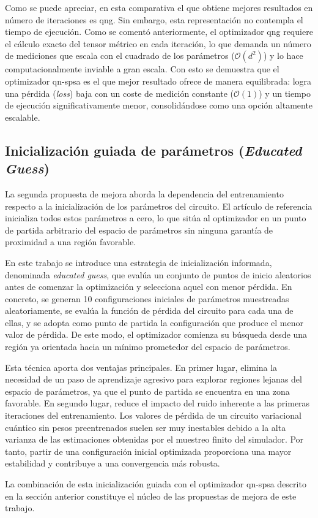 Como se puede apreciar, en esta comparativa el que obtiene mejores resultados en número de iteraciones es \gls{qng}. Sin embargo, esta representación no contempla el tiempo de ejecución. Como se comentó anteriormente, el optimizador \gls{qng} requiere el cálculo exacto del tensor métrico en cada iteración, lo que demanda un número de mediciones que escala con el cuadrado de los parámetros ($\mathcal{O}(d^2)$) y lo hace computacionalmente inviable a gran escala. Con esto se demuestra que el optimizador \gls{qn-spsa} es el que mejor resultado ofrece de manera equilibrada: logra una pérdida (\textit{loss}) baja con un coste de medición constante ($\mathcal{O}(1)$) y un tiempo de ejecución significativamente menor, consolidándose como una opción altamente escalable.

\subsection{Inicialización guiada de parámetros (\textit{Educated Guess})}
\label{subsec:educated_guess}

La segunda propuesta de mejora aborda la dependencia del entrenamiento respecto a la inicialización de los parámetros del circuito. El artículo de referencia \cite{ohno_qword2vec_2025} inicializa todos estos parámetros a cero, lo que sitúa al optimizador en un punto de partida arbitrario del espacio de parámetros sin ninguna garantía de proximidad a una región favorable.

En este trabajo se introduce una estrategia de inicialización informada, denominada \textit{educated guess}, que evalúa un conjunto de puntos de inicio aleatorios antes de comenzar la optimización y selecciona aquel con menor pérdida. En concreto, se generan 10 configuraciones iniciales de parámetros muestreadas aleatoriamente, se evalúa la función de pérdida del circuito para cada una de ellas, y se adopta como punto de partida la configuración que produce el menor valor de pérdida. De este modo, el optimizador comienza su búsqueda desde una región ya orientada hacia un mínimo prometedor del espacio de parámetros.

Esta técnica aporta dos ventajas principales. En primer lugar, elimina la necesidad de un paso de aprendizaje agresivo para explorar regiones lejanas del espacio de parámetros, ya que el punto de partida se encuentra en una zona favorable. En segundo lugar, reduce el impacto del ruido inherente a las primeras iteraciones del entrenamiento. Los valores de pérdida de un circuito variacional cuántico sin pesos preentrenados suelen ser muy inestables debido a la alta varianza de las estimaciones obtenidas por el muestreo finito del simulador. Por tanto, partir de una configuración inicial optimizada proporciona una mayor estabilidad y contribuye a una convergencia más robusta.

La combinación de esta inicialización guiada con el optimizador \gls{qn-spsa} descrito en la sección anterior constituye el núcleo de las propuestas de mejora de este trabajo.
